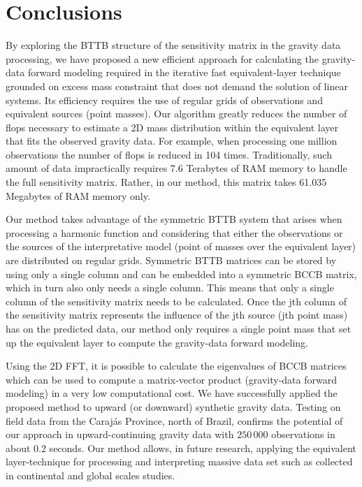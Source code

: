 \section{Conclusions}
By exploring the BTTB structure of the sensitivity matrix in the gravity data processing, we have proposed a new 
efficient approach for calculating the gravity-data forward modeling required in the iterative fast equivalent-layer 
technique grounded on excess mass constraint that does not demand  the solution of linear systems.  Its efficiency 
requires the use of regular grids of observations and equivalent sources (point masses). Our algorithm greatly reduces 
the number of  flops necessary to estimate a 2D mass distribution within the equivalent layer that fits the observed 
gravity data. For example, when processing one million observations the number of flops is reduced in 104 times. 
Traditionally, such amount of data impractically requires 7.6 Terabytes of RAM memory to handle the full sensitivity 
matrix. Rather, in our method, this matrix takes 61.035 Megabytes of RAM memory only.

Our method takes advantage of the symmetric BTTB system that arises when processing a harmonic function and considering 
that either the observations or the sources of the interpretative model (point of masses over the equivalent layer) 
are distributed on regular grids. Symmetric BTTB matrices can be stored by using only a single column and can be 
embedded into a symmetric BCCB matrix, which in turn also only needs a single column. 
This means that only a single column  of the sensitivity matrix needs to be calculated.  Once the jth column of the 
sensitivity matrix represents the influence of the jth source (jth point mass) has on the predicted data, our method 
only requires a single point mass that set up the equivalent layer to compute the gravity-data forward modeling.

Using the 2D FFT, it is possible to calculate the eigenvalues of BCCB matrices which can
be used to compute a matrix-vector product (gravity-data forward modeling) in a very low computational cost. 
We have successfully applied the proposed method to upward (or downward) synthetic gravity data. Testing on field 
data from the Caraj{\'a}s Province, north of Brazil, confirms the potential of our approach in upward-continuing 
gravity data with $250\,000$ observations in  about 0.2 seconds.  Our method allows, in future research, applying 
the equivalent layer-technique for processing and interpreting massive data set such as collected in continental 
and global scales studies.